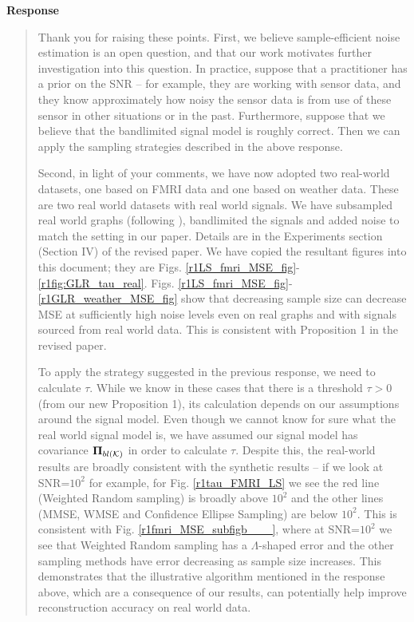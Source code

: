 \documentclass[11pt,onecolumn,journal]{IEEEtran}
\theoremstyle{definition}
\begin{document}
\textbf{Response}
\begin{quote}
Thank you for raising these points. First, we believe sample-efficient noise estimation is an open question, and that our work motivates further investigation into this question. In practice, suppose that a practitioner has a prior on the SNR -- for example, they are working with sensor data, and they know approximately how noisy the sensor data is from use of these sensor in other situations or in the past. Furthermore, suppose that we believe that the bandlimited signal model is roughly correct. Then we can apply the sampling strategies described in the above response.

Second, in light of your comments, we have now adopted two real-world datasets, one based on FMRI data and one based on weather data. These are two real world datasets with real world signals. We have subsampled real world graphs (following \cite{zhi2023gaussian}), bandlimited the signals and added noise to match the setting in our paper. Details are in the Experiments section (Section IV) of the revised paper. We have copied the resultant figures into this document; they are Figs. \ref{r1LS_fmri_MSE_fig}-\ref{r1fig:GLR_tau_real}.
Figs. \ref{r1LS_fmri_MSE_fig}-\ref{r1GLR_weather_MSE_fig} show that decreasing sample size can decrease MSE at sufficiently high noise levels even on real graphs and with signals sourced from real world data. This is consistent with Proposition 1 in the revised paper.

To apply the strategy suggested in the previous response, we need to calculate $\tau$. While we know in these cases that there is a threshold $\tau > 0$ (from our new Proposition 1), its calculation depends on our assumptions around the signal model. Even though we cannot know for sure what the real world signal model is, we have assumed our signal model has covariance $\projbl$ in order to calculate $\tau$. Despite this, the real-world results are broadly consistent with the synthetic results -- if we look at SNR=$10^{2}$ for example, for Fig. \ref{r1tau_FMRI_LS} we see the red line (Weighted Random sampling) is broadly above $10^2$ and the other lines (MMSE, WMSE and Confidence Ellipse Sampling) are below $10^2$. This is consistent with Fig. \ref{r1fmri_MSE_subfigb___}, where at SNR=$10^{2}$ we see that Weighted Random sampling has a $\Lambda$-shaped error and the other sampling methods have error decreasing as sample size increases. This demonstrates that the illustrative algorithm mentioned in the response above, which are a consequence of our results, can potentially help improve reconstruction accuracy on real world data.
\end{quote}
\end{document}
